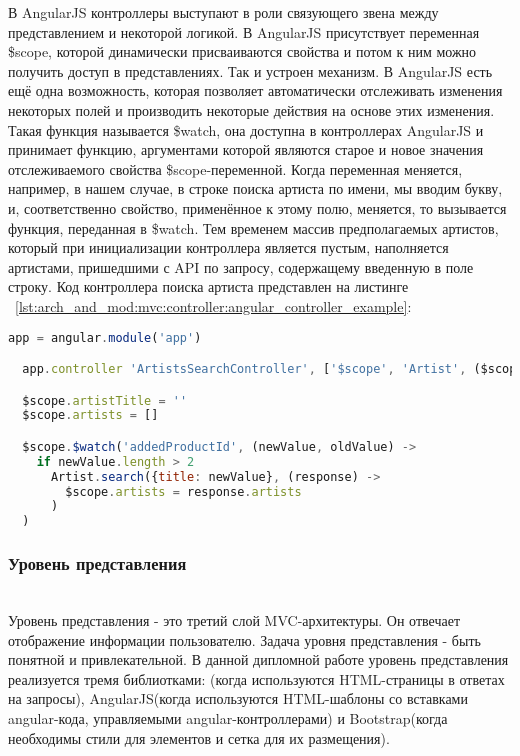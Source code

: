 В AngularJS контроллеры выступают в роли связующего звена между представлением и некоторой логикой. В AngularJS присутствует переменная \$scope, которой динамически присваиваются свойства и потом к ним можно получить доступ в представлениях. Так и устроен механизм. В AngularJS есть ещё одна возможность, которая позволяет автоматически отслеживать изменения некоторых полей и производить некоторые действия на основе этих изменения. Такая функция называется \$watch, она доступна в контроллерах AngularJS и принимает функцию, аргументами которой являются старое и новое значения отслеживаемого свойства \$scope-переменной. Когда переменная меняется, например, в нашем случае, в строке поиска артиста по имени, мы вводим букву, и, соответственно свойство, применённое к этому полю, меняется, то вызывается функция, переданная в \$watch. Тем временем массив предполагаемых артистов, который при инициализации контроллера является пустым, наполняется артистами, пришедшими с API по запросу, содержащему введенную в поле строку. Код контроллера поиска артиста представлен на листинге ~\ref{lst:arch_and_mod:mvc:controller:angular_controller_example}:

\begin{lstlisting}[language=JavaScript,caption={Пример получения артистов по определённым параметрам}, label=lst:arch_and_mod:mvc:controller:angular_controller_example]
  app = angular.module('app')

  app.controller 'ArtistsSearchController', ['$scope', 'Artist', ($scope, Artist) ->

  $scope.artistTitle = ''
  $scope.artists = []

  $scope.$watch('addedProductId', (newValue, oldValue) ->
    if newValue.length > 2
      Artist.search({title: newValue}, (response) ->
        $scope.artists = response.artists
      )
  )
\end{lstlisting}

\subsubsection{Уровень представления}
\label{sub:arch_and_mod:mvc:view}
~\\

Уровень представления - это третий слой MVC-архитектуры. Он отвечает отображение информации пользователю. Задача уровня представления - быть понятной и привлекательной. В данной дипломной работе уровень представления реализуется тремя библиотками: \ror{}(когда используются HTML-страницы в ответах на запросы), AngularJS(когда используются HTML-шаблоны со вставками angular-кода, управляемыми angular-контроллерами) и Bootstrap(когда необходимы стили для элементов и сетка для их размещения).

